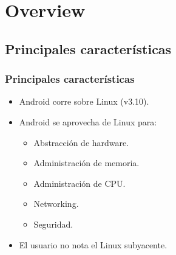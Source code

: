 \section{Overview}

\subsection{Principales características}
\begin{frame}
  \frametitle{Principales características}
  \begin{itemize}
    \item Android corre sobre Linux (v3.10).
    
    \item Android se aprovecha de Linux para:
      \begin{itemize}
	\item Abstracción de hardware.
	\item Administración de memoria.
	\item Administración de CPU.
	\item Networking.
	\item Seguridad.
      \end{itemize}
    
    \item El usuario no nota el Linux subyacente.
  \end{itemize}
\end{frame}

